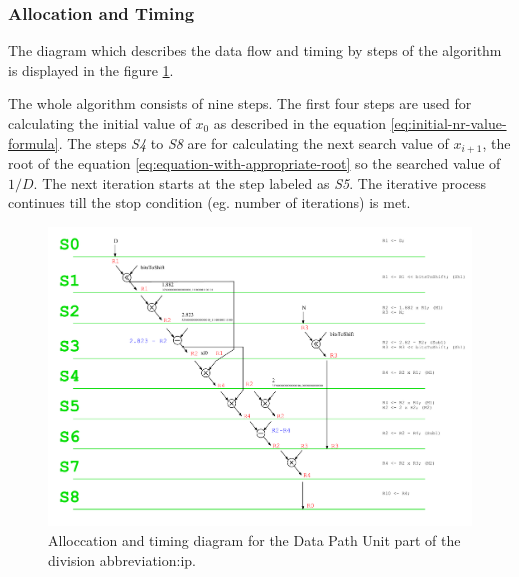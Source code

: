 \documentclass[a4paper, twoside, 11pt]{article}
\newcommand{\fbar}{\FloatBarrier}
\begin{document}
\subsubsection{Allocation and Timing}\label{subsubsec:division-allocation-and-timing}
The diagram which describes the data flow and timing by steps of the algorithm is displayed in the figure \ref{fig:division-allocation-timing}.\par
The whole algorithm consists of nine steps. The first four steps are used for calculating the initial value of $x_0$ as described in the equation \ref{eq:initial-nr-value-formula}. The steps \textit{S4} to \textit{S8} are for calculating the next search value of $x_{i+1}$, the root of the equation \ref{eq:equation-with-appropriate-root} so the searched value of $1/D$. The next iteration starts at the step labeled as \textit{S5}. The iterative process continues till the stop condition (eg. number of iterations) is met.
\begin{figure}[htbp!]
  \centering
  \includegraphics[width=1\textwidth]{src/pdf/allocation-timing.pdf}
   \caption{Alloccation and timing diagram for the Data Path Unit part of the division \gls{abbreviation:ip}.}
  \label{fig:division-allocation-timing}
\end{figure}

\fbar
\end{document}

